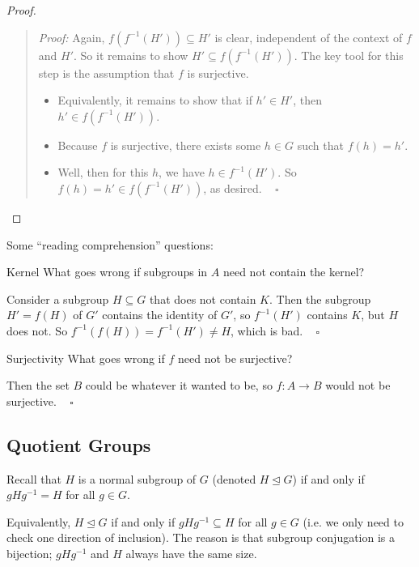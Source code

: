 \begin{proof}
\begin{quote}
        \emph{Proof:} Again, $f(f^{-1}(H')) \subseteq H'$ is clear, independent of the context of $f$ and $H'$.  So it remains to show $H' \subseteq f(f^{-1}(H'))$.  The key tool for this step is the assumption that $f$ is surjective.
        \begin{itemize}
            \item Equivalently, it remains to show that if $h' \in H'$, then $h' \in f(f^{-1}(H'))$.
            \item Because $f$ is surjective, there exists some $h \in G$ such that $f(h) = h'$.
            \item Well, then for this $h$, we have $h \in f^{-1}(H')$.  So $f(h) = h' \in f(f^{-1}(H'))$, as desired. ~ $\square$
        \end{itemize}
    \end{quote}
\end{proof}

Some ``reading comprehension'' questions:

\begin{problem}{Kernel}
    What goes wrong if subgroups in $A$ need not contain the kernel?
\end{problem}

\begin{solution}
    Consider a subgroup $H\subseteq G$ that does not contain $K$.  Then the subgroup $H' = f(H)$ of $G'$ contains the identity of $G'$, so $f^{-1}(H')$ contains $K$, but $H$ does not.  So $f^{-1}(f(H)) = f^{-1}(H') \neq H$, which is bad. ~ $\square$
\end{solution}

\begin{problem}{Surjectivity}
    What goes wrong if $f$ need not be surjective?
\end{problem}

\begin{solution}
    Then the set $B$ could be whatever it wanted to be, so $f: A \to B$ would not be surjective. ~ $\square$
\end{solution}

\subsection{Quotient Groups}

Recall that $H$ is a normal subgroup of $G$ (denoted $H \unlhd G$) if and only if $gHg^{-1} = H$ for all $g \in G$.

\begin{remark}
    Equivalently, $H \unlhd G$ if and only if $gHg^{-1} \subseteq H$ for all $g \in G$ (i.e. we only need to check one direction of inclusion).  The reason is that subgroup conjugation is a bijection; $gHg^{-1}$ and $H$ always have the same size.
\end{remark}

